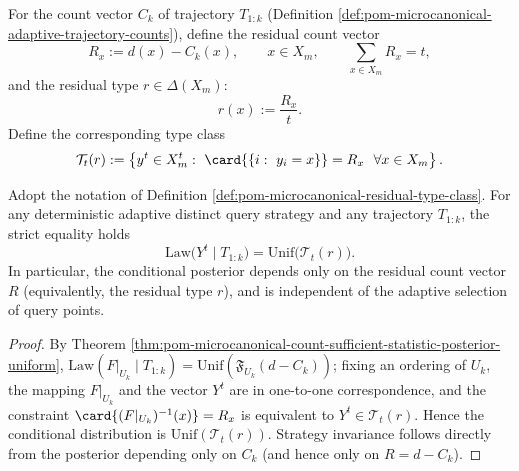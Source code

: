 \begin{definition}\label{def:pom-microcanonical-residual-type-class}
For the count vector \(C_k\) of trajectory \(T_{1:k}\) (Definition \ref{def:pom-microcanonical-adaptive-trajectory-counts}), define the residual count vector
\[
R_x:=d(x)-C_k(x),\qquad x\in X_m,
\qquad
\sum_{x\in X_m}R_x=t,
\]
and the residual type \(r\in\Delta(X_m)\):
\[
r(x):=\frac{R_x}{t}.
\]
Define the corresponding type class
\[
\mathcal{T}_t(r):=\left\{y^t\in X_m^t:\ \card{\{i:\ y_i=x\}}=R_x\ \ \forall x\in X_m\right\}.
\]
\end{definition}

\begin{proposition}\label{prop:pom-microcanonical-query-distortion-strategy-invariant-posterior}
Adopt the notation of Definition \ref{def:pom-microcanonical-residual-type-class}.
For any deterministic adaptive distinct query strategy and any trajectory \(T_{1:k}\), the strict equality holds
\[
\mathrm{Law}\bigl(Y^t\mid T_{1:k}\bigr)=\mathrm{Unif}\bigl(\mathcal{T}_t(r)\bigr).
\]
In particular, the conditional posterior depends only on the residual count vector \(R\) (equivalently, the residual type \(r\)), and is independent of the adaptive selection of query points.
\end{proposition}
\begin{proof}
By Theorem \ref{thm:pom-microcanonical-count-sufficient-statistic-posterior-uniform},
\(
\mathrm{Law}(F|_{U_k}\mid T_{1:k})=\mathrm{Unif}(\mathfrak{F}_{U_k}(d-C_k))
\);
fixing an ordering of \(U_k\), the mapping \(F|_{U_k}\) and the vector \(Y^t\) are in one-to-one correspondence, and the constraint \(\card{(F|_{U_k})^{-1}(x)}=R_x\) is equivalent to \(Y^t\in\mathcal{T}_t(r)\).
Hence the conditional distribution is \(\mathrm{Unif}(\mathcal{T}_t(r))\).
Strategy invariance follows directly from the posterior depending only on \(C_k\) (and hence only on \(R=d-C_k\)).
\end{proof}

